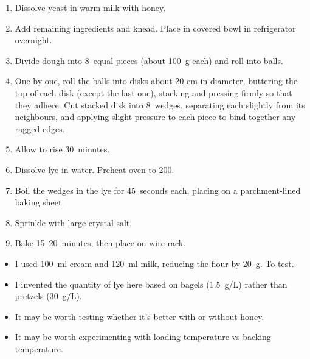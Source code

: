 
\begin{ingredients}
\end{ingredients}


\begin{recipe}
  \begin{enumerate}

  \item Dissolve yeast in warm milk with honey.

  \item Add remaining ingredients and knead.  Place in covered bowl in
refrigerator overnight.

  \item Divide dough into 8~equal pieces (about 100~g each) and roll
into balls.

  \item One by one, roll the balls into disks about 20 cm in diameter,
buttering the top of each disk (except the last one), stacking and
pressing firmly so that they adhere.  Cut stacked disk into 8~wedges,
separating each slightly from its neighbours, and applying slight
pressure to each piece to bind together any ragged edges.

  \item Allow to rise 30~minutes.

  \item Dissolve lye in water.  Preheat oven to 200\degreeC.

  \item Boil the wedges in the lye for 45~seconds each, placing on a
parchment-lined baking sheet.

  \item Sprinkle with large crystal salt.

  \item Bake 15--20~minutes, then place on wire rack.

  \end{enumerate}
\end{recipe}

\notes
\begin{itemize}
\item I used 100~ml cream and 120~ml milk, reducing the flour by
  20~g.  To test.
\item I invented the quantity of lye here based on bagels (1.5~g/L)
  rather than pretzels (30~g/L).
\item It may be worth testing whether it's better with or without
  honey.
\item It may be worth experimenting with loading temperature vs
  backing temperature.
\end{itemize}

